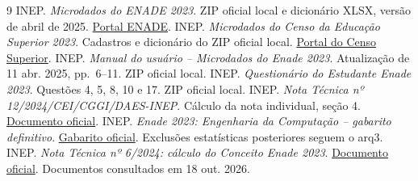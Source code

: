 \documentclass[12pt,a4paper]{article}
\begin{document}
\begin{thebibliography}{9}
 INEP. \textit{Microdados do ENADE 2023}.
ZIP oficial local e dicionário XLSX, versão de abril de 2025.
\href{https://www.gov.br/inep/pt-br/acesso-a-informacao/dados-abertos/microdados/enade}{Portal ENADE}.
 INEP. \textit{Microdados do Censo da Educação Superior 2023}.
Cadastros e dicionário do ZIP oficial local.
\href{https://www.gov.br/inep/pt-br/acesso-a-informacao/dados-abertos/microdados/censo-da-educacao-superior}{Portal do Censo Superior}.
 INEP. \textit{Manual do usuário -- Microdados do Enade 2023}.
Atualização de 11 abr. 2025, pp.~6--11. ZIP oficial local.
 INEP. \textit{Questionário do Estudante Enade 2023}.
Questões 4, 5, 8, 10 e 17. ZIP oficial local.
 INEP. \textit{Nota Técnica nº 12/2024/CEI/CGGI/DAES-INEP}.
Cálculo da nota individual, seção 4.
\href{https://download.inep.gov.br/educacao_superior/enade/notas_tecnicas/2024/nota_tecnica_12_calculo_nota_final_enade_2023.pdf}{Documento oficial}.
 INEP. \textit{Enade 2023: Engenharia da Computação -- gabarito definitivo}.
\href{https://download.inep.gov.br/enade/provas_e_gabaritos/2023_GB_engenharia_da_computacao.pdf}{Gabarito oficial}.
Exclusões estatísticas posteriores seguem o arq3.
 INEP. \textit{Nota Técnica nº 6/2024: cálculo do Conceito Enade 2023}.
\href{https://download.inep.gov.br/educacao_superior/enade/notas_tecnicas/2024/nota_tecnica_6_metodologia_calculo_conceito_enade_2023.pdf}{Documento oficial}.
Documentos consultados em 18 out. 2026.
\end{thebibliography}
\end{document}
